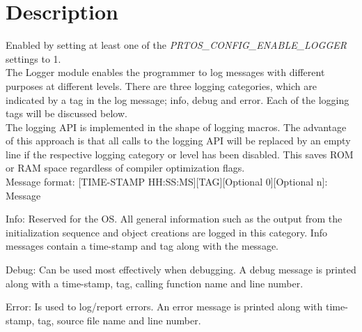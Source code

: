 \section{Description}
Enabled by setting at least one of the \textit{PRTOS\_CONFIG\_ENABLE\_LOGGER} settings to 1.\\
The Logger module enables the programmer to log messages with different purposes at different levels. There are three logging categories, which are indicated by a tag in the log message; info, debug and error. Each of the logging tags will be discussed below.\\
The logging API is implemented in the shape of logging macros. The advantage of this approach is that all calls to the logging API will be replaced by an empty line if the respective logging category or level has been disabled. This saves ROM or RAM space regardless of compiler optimization flags.\\
Message format: [TIME-STAMP HH:SS:MS][TAG][Optional 0][Optional n]: Message
\begin{pditemize}
	\item Info: Reserved for the OS. All general information such as the output from the initialization sequence and object creations are logged in this category. Info messages contain a time-stamp and tag along with the message.
	\item Debug: Can be used most effectively when debugging. A debug message is printed along with a time-stamp, tag, calling function name and line number.
	\item Error: Is used to log/report errors. An error message is printed along with time-stamp, tag, source file name and line number.
\end{pditemize}